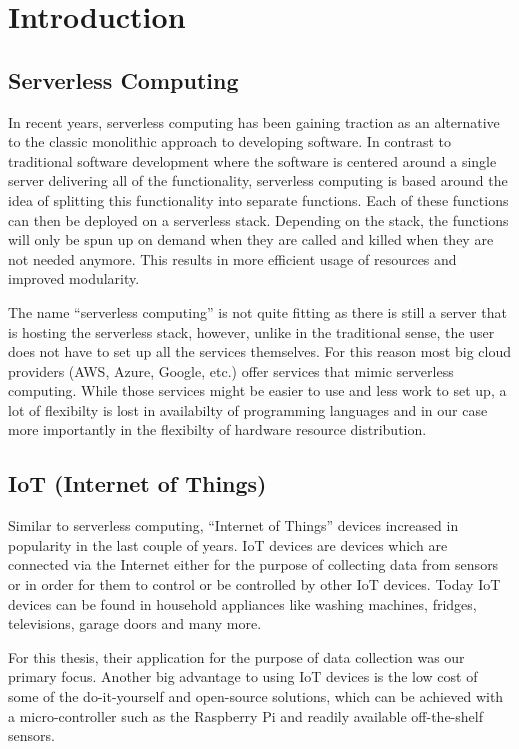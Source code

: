 \section{Introduction}

\subsection{Serverless Computing}

In recent years, serverless computing has been gaining traction as an alternative to the classic
monolithic approach to developing software. In contrast to traditional software development where
the software is centered around a single server delivering all of the functionality, serverless
computing is based around the idea of splitting this functionality into separate functions. Each of
these functions can then be deployed on a serverless stack. Depending on the stack, the functions
will only be spun up on demand when they are called and killed when they are not needed anymore.
This results in more efficient usage of resources and improved modularity.

The name “serverless computing” is not quite fitting as there is still a server that is hosting the
serverless stack, however, unlike in the traditional sense, the user does not have to set up all
the services themselves. For this reason most big cloud providers (AWS, Azure, Google, etc.) offer
services that mimic serverless computing. While those services might be easier to use and less work
to set up, a lot of flexibilty is lost in availabilty of programming languages and in our case more
importantly in the flexibilty of hardware resource distribution.


\subsection{IoT (Internet of Things)}

Similar to serverless computing, “Internet of Things” devices increased in popularity in the last
couple of years. IoT devices are devices which are connected via the Internet either for the
purpose of collecting data from sensors or in order for them to control or be controlled by other
IoT devices. Today IoT devices can be found in household appliances like washing machines, fridges,
televisions, garage doors and many more.

For this thesis, their application for the purpose of data collection was our primary
focus. Another big advantage to using IoT devices is the low cost of some of the do-it-yourself and
open-source solutions, which can be achieved with a micro-controller such as the Raspberry Pi and
readily available off-the-shelf sensors.

